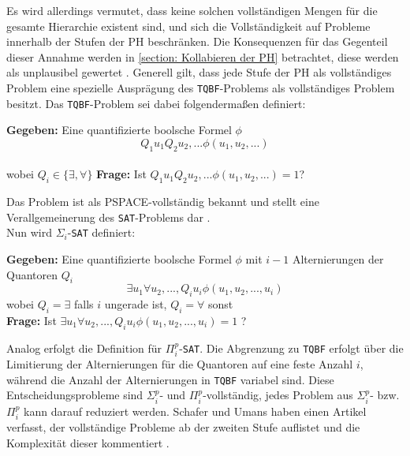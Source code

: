 Es wird allerdings vermutet, dass keine solchen vollständigen Mengen für die gesamte Hierarchie existent sind, und sich die Vollständigkeit auf Probleme innerhalb der
Stufen der PH beschränken. Die Konsequenzen für das Gegenteil dieser Annahme werden in \ref{section: Kollabieren der PH} betrachtet, diese werden als unplausibel gewertet \cite{arora_computational_2009}.
Generell gilt, dass jede Stufe der PH als vollständiges Problem eine spezielle Ausprägung des \texttt{TQBF}-Problems als vollständiges Problem besitzt.
Das \texttt{TQBF}-Problem sei dabei folgendermaßen definiert:
\begin{definition} \cite{sipser_introduction_2012}
    \textbf{Gegeben:} Eine quantifizierte boolsche Formel $\phi$ 
    $$
    Q_1 u_1 Q_2 u_2, ... \phi(u_1, u_2, ...)
    $$ \\
    wobei $Q_i \in \{\exists, \forall\}$
    \textbf{Frage:} Ist $Q_1 u_1 Q_2 u_2, ... \phi(u_1, u_2, ...) = 1$?
\end{definition}
Das Problem ist als PSPACE-vollständig bekannt und stellt eine Verallgemeinerung des \texttt{SAT}-Problems dar \cite{arora_computational_2009}. \\
Nun wird $\Sigma_i$-\texttt{SAT} definiert:
\begin{definition} \cite{arora_computational_2009}
    \textbf{Gegeben:} Eine quantifizierte boolsche Formel $\phi$ mit $i-1$ Alternierungen der Quantoren $Q_i$ 
    $$
    \exists u_1 \forall u_2, ..., Q_i u_i \phi(u_1, u_2, ..., u_i)
    $$
    wobei $Q_i = \exists $ falls $i$ ungerade ist, $Q_i = \forall$ sonst \\
    \textbf{Frage:} Ist $\exists u_1 \forall u_2, ..., Q_i u_i \phi(u_1, u_2, ..., u_i) = 1$ ?
\end{definition}

Analog erfolgt die Definition für $\Pi^p_i$-\texttt{SAT}. Die Abgrenzung zu \texttt{TQBF} erfolgt über die Limitierung der Alternierungen für die Quantoren auf eine feste Anzahl $i$, während 
die Anzahl der Alternierungen in \texttt{TQBF} variabel sind.
Diese Entscheidungsprobleme sind $\Sigma^p_i$- und $\Pi^p_i$-vollständig, jedes Problem aus $\Sigma^p_i$- bzw. $\Pi^p_i$ kann darauf reduziert werden.
Schafer und Umans haben einen Artikel verfasst, der vollständige Probleme ab der zweiten Stufe auflistet und die Komplexität dieser kommentiert \cite{schaefer_completeness_nodate}.



